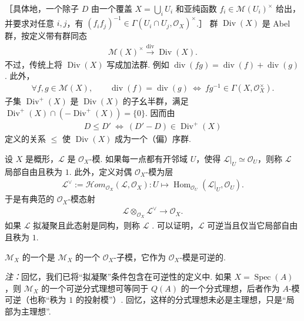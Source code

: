 ［具体地，一个除子 $D$ 由一个覆盖 $X=\bigcup_iU_i$ 和亚纯函数 $f_i\in\mathcal M(U_i)^\times$ 给出，并要求对任意 $i,j$，有 $(f_if_j)^{-1}\in\Gamma(U_i\cap U_j,\mathcal O_X)^\times$.］
群 $\operatorname{Div}(X)$ 是 Abel 群，按定义带有群同态
\begin{align*}
\mathcal M(X)^\times\xrightarrow{\operatorname{div}}\operatorname{Div}(X).
\end{align*}
不过，传统上将 $\operatorname{Div}(X)$ 写成加法群. 例如 $\operatorname{div}(fg)=\operatorname{div}(f)+\operatorname{div}(g)$. 此外，
\begin{align*}
\forall f,g\in\mathcal M(X),\qquad
\operatorname{div}(f)=\operatorname{div}(g)\ \Longleftrightarrow\ fg^{-1}\in\Gamma(X,\mathcal O_X^\times).
\end{align*}
子集 $\operatorname{Div}^+(X)$ 是 $\operatorname{Div}(X)$ 的子幺半群，满足 $\operatorname{Div}^+(X)\cap(-\operatorname{Div}^+(X))=\{0\}$. 因而由
\begin{align*}
D\leqslant D'\ \Longleftrightarrow\ (D'-D)\in\operatorname{Div}^+(X)
\end{align*}
定义的关系 $\leqslant$ 使 $\operatorname{Div}(X)$ 成为一个（偏）序群.
\begin{numpara}[可逆理想的回顾]\label{item:ag-1-1-5}
设 $X$ 是概形，$\mathcal L$ 是 $\mathcal O_X$-模. 如果每一点都有开邻域 $U$，使得 $\mathcal L|_U\simeq\mathcal O_U$，则称 $\mathcal L$ 局部自由且秩为 $1$.
此外，定义对偶 $\mathcal O_X$-模为层
\begin{align*}
\mathcal L^\vee:=\mathcal Hom_{\mathcal O_X}(\mathcal L,\mathcal O_X):
U\longmapsto\operatorname{Hom}_{\mathcal O_U}(\mathcal L|_U,\mathcal O_U).
\end{align*}
于是有典范的 $\mathcal O_X$-模态射
\begin{align*}
\mathcal L\otimes_{\mathcal O_X}\mathcal L^\vee\longrightarrow\mathcal O_X.
\end{align*}
如果 $\mathcal L$ 拟凝聚且此态射是同构，则称 $\mathcal L$ .
可以证明，$\mathcal L$ 可逆当且仅当它局部自由且秩为 $1$.
\end{numpara}
\begin{definition}\label{item:ag-1-1-6}
$\mathcal M_X$ 的一个是 $\mathcal M_X$ 的一个 $\mathcal O_X$-子模，它作为 $\mathcal O_X$-模是可逆的.
\end{definition}
\emph{注：}回忆，我们已将``拟凝聚''条件包含在可逆性的定义中. 如果 $X=\operatorname{Spec}(A)$，则 $\mathcal M_X$ 的一个可逆分式理想可等同于 $Q(A)$ 的一个分式理想，后者作为 $A$-模可逆（也称``秩为 $1$ 的投射模''）. 回忆，这样的分式理想未必是主理想，只是``局部为主理想''.
